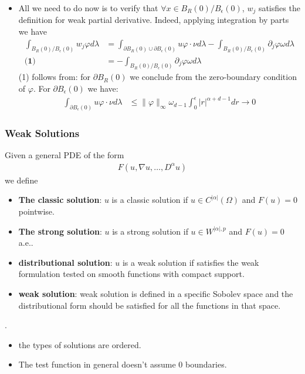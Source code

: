 \begin{example}
\begin{itemize}
\begin{align*}
		&= \lim_{\epsilon \rightarrow 0}- \int_{B_R(0)\slash B_\epsilon (0)} u \partial_j \varphi  d\lambda
	\end{align*} 
	Given the condition that $w_j$, $u$ are in $L^p$. Notice that $u \in L^p$ implies that $w_j \in L^p$.
	\item All we need to do now is to verify that $\forall x \in B_R(0) \slash B_\epsilon(0)$, $w_j$ satisfies the definition for weak partial derivative. Indeed, applying integration by parts we have
	\begin{align*}
		\int_{B_R(0)\slash B_\epsilon (0)} w_j \varphi d\lambda &= \int_{\partial B_R(0) \cup \partial B_\epsilon(0)} u \varphi \cdot \nu  d\lambda - \int_{B_R(0)\slash B_\epsilon (0)} \partial_j \varphi \omega d\lambda\\
		\textbf{(1)}&=  - \int_{B_R(0)\slash B_\epsilon (0)} \partial_j \varphi \omega d\lambda
	\end{align*}
	(1) follows from: for $\partial B_R(0)$ we conclude from the zero-boundary condition of $\varphi$. For $\partial B_\epsilon(0)$ we have:
	\begin{align*}
		\int_{\partial B_\epsilon(0)}u \varphi \cdot \nu d \lambda &\leq \|\varphi\|_\infty \omega_{d-1} \int_0^\epsilon |r|^{\alpha + d -1} dr \rightarrow 0
	\end{align*}
\end{itemize}
\end{example}


\subsubsection{Weak Solutions}
\begin{definition}
	Given a general PDE of the form 
	\begin{align*}
		F(u, \nabla u, \dots,  D^\alpha u)
	\end{align*}
	we define
	\begin{itemize}
		\item \textbf{The classic solution}: $u$ is a classic solution if $u \in C^{|\alpha|}(\Omega)$ and $F(u) = 0$ pointwise.
		\item \textbf{The strong solution}: $u$ is a strong solution if $u \in W^{|\alpha|, p}$ and $F(u) = 0$ a.e..
		\item \textbf{distributional solution}: $u$ is a weak solution if satisfies the weak formulation tested on smooth functions with compact support.
		\item \textbf{weak solution}: weak solution is defined in a specific Sobolev space and the distributional form should be satisfied for all the functions in that space. 
	\end{itemize}
\end{definition}
\begin{remark}.
\begin{itemize}
	\item the types of solutions are ordered.
	\item The test function in general doesn't assume $0$ boundaries. 
\end{itemize}	
\end{remark}

